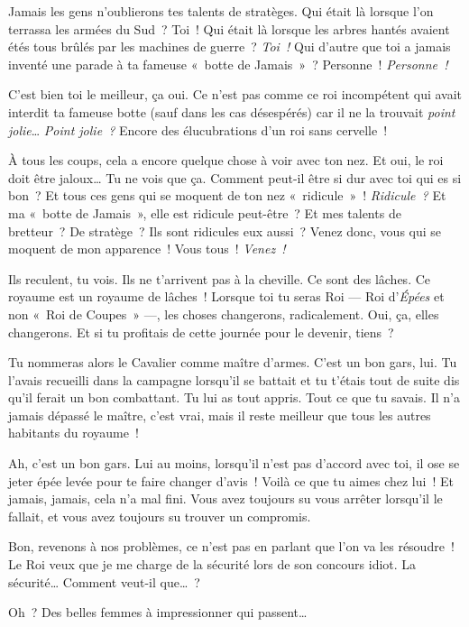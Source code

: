 {{Jamais les gens n’oublierons tes talents de stratèges.
Qui était là lorsque l’on terrassa les armées du Sud~? Toi~!
Qui était là lorsque les arbres hantés avaient étés tous brûlés par les machines de guerre~? \emph{Toi~!}
Qui d’autre que toi a jamais inventé une parade à ta fameuse «~botte de Jamais~»~? Personne~! \emph{Personne~!}

C’est bien toi le meilleur, ça oui.
Ce n’est pas comme ce roi incompétent qui avait interdit ta fameuse botte (sauf dans les cas désespérés) car il ne la trouvait \textit{point jolie}…
\emph{Point jolie~?}
Encore des élucubrations d’un roi sans cervelle~!

À tous les coups, cela a encore quelque chose à voir avec ton nez.
Et oui, le roi doit être jaloux…  Tu ne vois que ça.
Comment peut-il être si dur avec toi qui es si bon~?
Et tous ces gens qui se moquent de ton nez «~ridicule~»~!
\emph{Ridicule~?}
Et ma «~botte de Jamais~», elle est ridicule peut-être~?
Et mes talents de bretteur~?  De stratège~?
Ils sont ridicules eux aussi~?
Venez donc, vous qui se moquent de mon apparence~!
Vous tous~!  \emph{Venez~!}

Ils reculent, tu vois.
Ils ne t’arrivent pas à la cheville.
Ce sont des lâches.
Ce royaume est un royaume de lâches~!
Lorsque toi tu seras Roi — Roi d’\emph{Épées} et non «~Roi de Coupes~» —, les choses changerons, radicalement.
Oui, ça, elles changerons.  Et si tu profitais de cette journée pour le devenir, tiens~?

Tu nommeras alors le Cavalier comme maître d’armes.
C’est un bon gars, lui.
Tu l’avais recueilli dans la campagne lorsqu’il se battait et tu t’étais tout de suite dis qu’il ferait un bon combattant.
Tu lui as tout appris.
Tout ce que tu savais.
Il n’a jamais dépassé le maître, c’est vrai, mais il reste meilleur que tous les autres habitants du royaume~!

Ah, c’est un bon gars.
Lui au moins, lorsqu’il n’est pas d’accord avec toi, il ose se jeter épée levée pour te faire changer d’avis~!
Voilà ce que tu aimes chez lui~!
Et jamais, jamais, cela n’a mal fini.
Vous avez toujours su vous arrêter lorsqu’il le fallait, et vous avez toujours su trouver un compromis.

Bon, revenons à nos problèmes, ce n’est pas en parlant que l’on va les résoudre~!
Le Roi veux que je me charge de la sécurité lors de son concours idiot.
La sécurité…
Comment veut-il que…~?

Oh~?  Des belles femmes à impressionner qui passent…

}}
